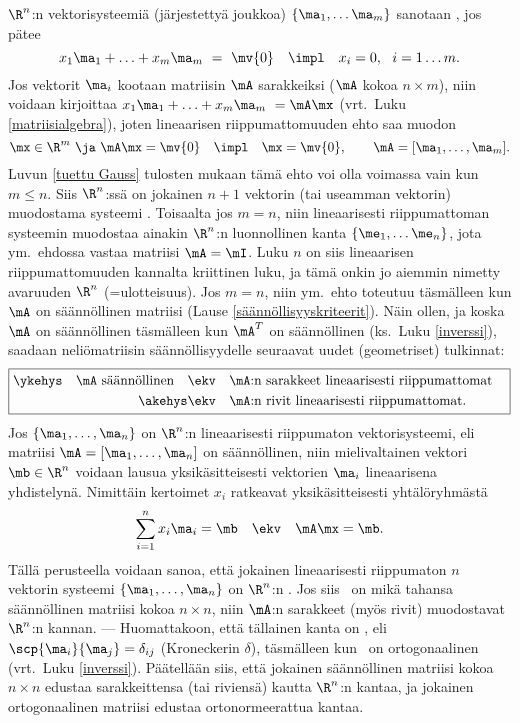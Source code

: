 $\R^n$:n vektorisysteemiä (järjestettyä joukkoa) $\{\ma_1, \ldots \ma_m\}$ sanotaan 
%
, jos pätee
\[ 
x_1 \ma_1 + \ldots + x_m \ma_m\ =\ \mv{0} \quad \impl \quad x_i = 0, \ \ i = 1 \ldots m. 
\]
Jos vektorit $\ma_i$ kootaan matriisin $\mA$ sarakkeiksi ($\mA$ kokoa $n \times m$), niin 
voidaan kirjoittaa $x_1 \ma_1 + \ldots + x_m \ma_m\ = \mA\mx$ 
(vrt.\ Luku \ref{matriisialgebra}), joten lineaarisen riippumattomuuden ehto saa muodon
\[ 
\mx \in \R^m\ \ja\ \mA\mx = \mv{0} \quad \impl \quad \mx = \mv{0}, \quad\quad \mA 
                          = [\ma_1, \ldots, \ma_m]. 
\]
Luvun \ref{tuettu Gauss} tulosten mukaan tämä ehto voi olla voimassa vain kun $m \le n$. Siis
$\R^n$:ssä on jokainen $n+1$ vektorin (tai useamman vektorin) muodostama systeemi 
%
. Toisaalta jos $m=n$, niin lineaarisesti riippumattoman systeemin
muodostaa ainakin $\R^n$:n luonnollinen kanta $\{\me_1, \ldots \me_n\}$, jota ym.\ ehdossa 
vastaa matriisi $\mA=\mI$. Luku $n$ on siis lineaarisen riippumattomuuden kannalta kriittinen
luku, ja tämä onkin jo aiemmin nimetty avaruuden $\R^n$
%
 (=ulotteisuus). Jos
$m=n$, niin ym.\ ehto toteutuu täsmälleen kun $\mA$ on säännöllinen matriisi 
(Lause \ref{säännöllisyyskriteerit}). Näin ollen, ja koska $\mA$ on säännöllinen täsmälleen kun
$\mA^T$ on säännöllinen (ks.\ Luku \ref{inverssi}), saadaan neliömatriisin säännöllisyydelle
seuraavat uudet (geometriset) tulkinnat:
\[ \boxed{ \begin{aligned} 
\ykehys\quad \mA\ \text{säännöllinen} \quad 
             &\ekv \quad \text{\mA:n sarakkeet lineaarisesti riippumattomat} \quad \\
\akehys      &\ekv \quad \text{\mA:n rivit lineaarisesti riippumattomat}. \quad
           \end{aligned} } \] 
Jos $\{\ma_1, \ldots, \ma_n\}$ on $\R^n$:n lineaarisesti riippumaton vektorisysteemi, eli 
matriisi $\mA = [\ma_1, \ldots, \ma_n]$ on säännöllinen, niin mielivaltainen vektori 
$\mb \in \R^n$ voidaan lausua yksikäsitteisesti vektorien $\ma_i$ lineaarisena yhdistelynä. 
Nimittäin kertoimet $x_i$ ratkeavat yksikäsitteisesti yhtälöryhmästä
\[ 
\sum_{i=1}^n x_i \ma_i = \mb \quad \ekv \quad \mA\mx = \mb.
\]
Tällä perusteella voidaan sanoa, että jokainen lineaarisesti riippumaton $n$ vektorin systeemi
$\{\ma_1, \ldots, \ma_n\}$ on $\R^n$:n
%
. Jos siis \mA\ on mikä tahansa säännöllinen
matriisi kokoa $n \times n$, niin $\mA$:n sarakkeet (myös rivit) muodostavat $\R^n$:n kannan. 
--- Huomattakoon, että tällainen kanta on
%
, eli 
$\scp{\ma_i}{\ma_j} = \delta_{ij}$ (Kroneckerin $\delta$), täsmälleen kun \mA\ on ortogonaalinen
(vrt.\ Luku \ref{inverssi}). Päätellään siis, että jokainen säännöllinen matriisi kokoa 
$n \times n$ edustaa sarakkeittensa (tai riviensä) kautta $\R^n$:n kantaa, ja jokainen 
ortogonaalinen matriisi edustaa ortonormeerattua kantaa.


